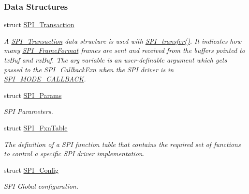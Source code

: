 \subsubsection*{Data Structures}
\begin{DoxyCompactItemize}
\item 
struct \hyperlink{struct_s_p_i___transaction}{S\+P\+I\+\_\+\+Transaction}
\begin{DoxyCompactList}\small\item\em A \hyperlink{struct_s_p_i___transaction}{S\+P\+I\+\_\+\+Transaction} data structure is used with \hyperlink{_s_p_i_8h_a989e17f96b54fcc3dc2cac5f8ac6bdb2}{S\+P\+I\+\_\+transfer()}. It indicates how many \hyperlink{_s_p_i_8h_a53949638d43ae7bf71b74c2b136ad206}{S\+P\+I\+\_\+\+Frame\+Format} frames are sent and received from the buffers pointed to tx\+Buf and rx\+Buf. The arg variable is an user-\/definable argument which gets passed to the \hyperlink{_s_p_i_8h_a207e2d5a7e7ea5606b6995b6485ca015}{S\+P\+I\+\_\+\+Callback\+Fxn} when the S\+P\+I driver is in \hyperlink{_s_p_i_8h_ab9ea76c6529d6076eee5e1c4a5a92c6fa5631e69925c47a62a261c78ebbda39fb}{S\+P\+I\+\_\+\+M\+O\+D\+E\+\_\+\+C\+A\+L\+L\+B\+A\+C\+K}. \end{DoxyCompactList}\item 
struct \hyperlink{struct_s_p_i___params}{S\+P\+I\+\_\+\+Params}
\begin{DoxyCompactList}\small\item\em S\+P\+I Parameters. \end{DoxyCompactList}\item 
struct \hyperlink{struct_s_p_i___fxn_table}{S\+P\+I\+\_\+\+Fxn\+Table}
\begin{DoxyCompactList}\small\item\em The definition of a S\+P\+I function table that contains the required set of functions to control a specific S\+P\+I driver implementation. \end{DoxyCompactList}\item 
struct \hyperlink{struct_s_p_i___config}{S\+P\+I\+\_\+\+Config}
\begin{DoxyCompactList}\small\item\em S\+P\+I Global configuration. \end{DoxyCompactList}\end{DoxyCompactItemize}
